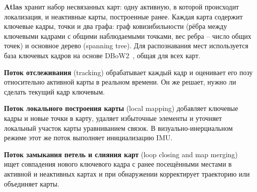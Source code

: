     \textbf{Atlas} хранит набор несвязанных карт: одну активную, в которой происходит локализация, и неактивные карты, построенные ранее.
    Каждая карта содержит ключевые кадры, точки и два графа: граф ковизибильности (рёбра между ключевыми кадрами с общими наблюдаемыми точками, вес ребра -- число общих точек) и основное дерево (spanning tree).
    Для распознавания мест используется база ключевых кадров на основе DBoW2~\cite{dbow2}, общая для всех карт.

    \textbf{Поток отслеживания} (tracking) обрабатывает каждый кадр и оценивает его позу относительно активной карты в реальном времени.
    Он же решает, нужно ли сделать текущий кадр ключевым.

    \textbf{Поток локального построения карты} (local mapping) добавляет ключевые кадры и новые точки в карту, удаляет избыточные элементы и уточняет локальный участок карты уравниванием связок.
    В визуально-инерциальном режиме этот же поток выполняет инициализацию IMU.

    \textbf{Поток замыкания петель и слияния карт} (loop closing and map merging) ищет совпадения нового ключевого кадра с ранее посещёнными местами в активной и неактивных картах и при обнаружении корректирует траекторию или объединяет карты.

